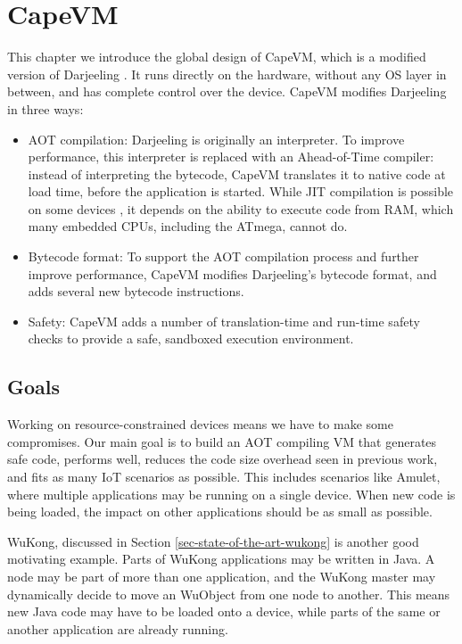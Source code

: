 \chapter{CapeVM}

This chapter we introduce the global design of CapeVM, which is a modified version of Darjeeling \cite{Brouwers:2009cj}. It runs directly on the hardware, without any OS layer in between, and has complete control over the device. CapeVM modifies Darjeeling in three ways:
\begin{itemize}
    \item AOT compilation: Darjeeling is originally an interpreter. To improve performance, this interpreter is replaced with an Ahead-of-Time compiler: instead of interpreting the bytecode, CapeVM translates it to native code at load time, before the application is started. While JIT compilation is possible on some devices \cite{Ellul:2012thesis}, it depends on the ability to execute code from RAM, which many embedded CPUs, including the ATmega, cannot do.
    \item Bytecode format: To support the AOT compilation process and further improve performance, CapeVM modifies Darjeeling's bytecode format, and adds several new bytecode instructions.
    \item Safety: CapeVM adds a number of translation-time and run-time safety checks to provide a safe, sandboxed execution environment.
\end{itemize}

\section{Goals}
\label{sec-CapeVM-goals}
Working on resource-constrained devices means we have to make some compromises. Our main goal is to build an AOT compiling VM that generates safe code, performs well, reduces the code size overhead seen in previous work, and fits as many IoT scenarios as possible. This includes scenarios like Amulet, where multiple applications may be running on a single device. When new code is being loaded, the impact on other applications should be as small as possible.

WuKong, discussed in Section \ref{sec-state-of-the-art-wukong} is another good motivating example. Parts of WuKong applications may be written in Java. A node may be part of more than one application, and the WuKong master may dynamically decide to move an WuObject from one node to another. This means new Java code may have to be loaded onto a device, while parts of the same or another application are already running.

